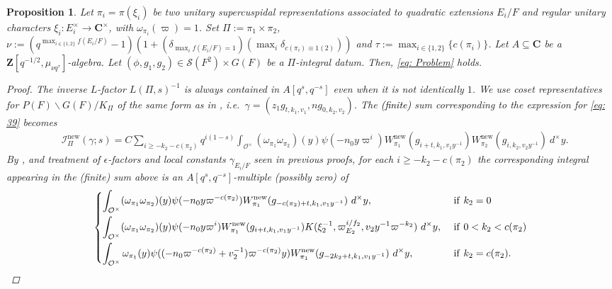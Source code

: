 \documentclass{amsart}
\theoremstyle{plain}
\newtheorem{prop}[thm]{Proposition}
\theoremstyle{plain}
\theoremstyle{remark}
\begin{document}
\begin{prop}
    Let $\pi_i=\pi(\xi_i)$ be two unitary supercuspidal representations associated to quadratic extensions $E_i/F$ and regular unitary characters $\xi_i:E_i^\times\rightarrow\mathbf{C}^\times$, with $\omega_{\pi_i}(\varpi)=1$. Set $\Pi:=\pi_1\times \pi_2$, $\nu:=(q^{\max_{i\in\{1,2\}}f(E_i/F)}-1)(1+(\delta_{\max_{i}f(E_i/F)=1})(\max_{i}\delta_{c(\pi_i)\equiv1(2)}))$ and $\tau:=\max_{i\in\{1,2\}}\{c(\pi_i)\}$. Let $A\subseteq\mathbf{C}$ be a $\mathbf{Z}[q^{-1/2},\mu_{\nu q^\tau}]$-algebra. Let $(\phi,g_1,g_2)\in \mathcal{S}(F^2)\times G(F)$ be a $\Pi$-integral datum. Then, \eqref{eq: Problem} holds.
    \begin{proof}
        The inverse $L$-factor $L(\Pi,s)^{-1}$ is always contained in $A[q^s,q^{-s}]$ even when it is not identically $1$. We use coset representatives for $P(F)\backslash G(F)/K_\Pi$ of the same form as in , i.e.\ $\gamma=(z_1g_{t,k_1,v_1},ng_{0,k_2,v_2})$. The \textcolor{black}{(finite)} sum corresponding to the expression for \eqref{eq: 39} becomes
        \begin{align}\label{eq: 44}
            &{\mathcal{I}_{\Pi}^\mathrm{new}(\gamma;s)=C\sum_{i\geq -k_2-c(\pi_2)}q^{i(1-s)}\int_{\mathcal{O}^\times}(\omega_{\pi_1}\omega_{\pi_2})(y)\psi(-n_0y\varpi^i)W_{\pi_1}^\mathrm{new}(g_{i+t,k_1,v_1y^{-1}})W_{\pi_2}^\mathrm{new}(g_{i,k_2,v_2y^{-1}})\ d^\times y}. 
        \end{align}
        By , and treatment of $\epsilon$-factors and local constants $\gamma_{E_i/F}$ seen in previous proofs, for each $i\geq -k_2-c(\pi_2)$ the corresponding integral appearing in the (finite) sum above is an $A[q^s,q^{-s}]$-multiple (possibly zero) of 
        $$\begin{dcases}
            \int_{\mathcal{O}^\times}(\omega_{\pi_1}\omega_{\pi_2})(y)\psi(-n_0y\varpi^{-c(\pi_2)})W_{\pi_1}^\mathrm{new}(g_{-c(\pi_2)+t,k_1,v_1y^{-1}})\ d^\times y,\ &\mathrm{if}\ k_2=0\\
            \int_{\mathcal{O}^\times}(\omega_{\pi_1}\omega_{\pi_2})(y)\psi(-n_0y\varpi^i)W_{\pi_1}^\mathrm{new}(g_{i+t,k_1,v_1y^{-1}})K(\xi_2^{-1},\varpi_{E_2}^{i/f_2},v_2y^{-1}\varpi^{-k_2})\  d^\times y,\ &\mathrm{if}\ 0<k_2<c(\pi_2) \\
            \int_{\mathcal{O}^\times}\omega_{\pi_1}(y)\psi((-n_0\varpi^{-c(\pi_2)}+v_2^{-1})\varpi^{-c(\pi_2)}y)W_{\pi_1}^\mathrm{new}(g_{-2k_2+t,k_1,v_1y^{-1}})\ d^\times y,\ &\mathrm{if}\ k_2=c(\pi_2).
        \end{dcases}$$

\end{proof}
\end{prop}
\end{document}
